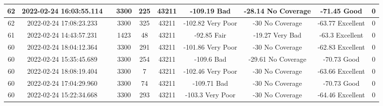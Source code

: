 \begin{longtable*}{|c|c|c|c|c|c|c|c|c|c|}
62&2022-02-24 16:03:55.114&&3300&225&43211& -109.19   Bad         & -28.14    No Coverage & -71.45    Good        & 0\\\hline
{}62&2022-02-24 17:08:23.233&&3300&325&43211& -102.82   Very Poor   & -30       No Coverage & -63.77    Excellent   & 0\\\hline
{}61&2022-02-24 14:43:57.231&&1423&48&43211& -92.85    Fair        & -19.27    Very Bad    & -63.3     Excellent   & 0\\\hline
{}60&2022-02-24 18:04:12.364&&3300&291&43211& -101.86   Very Poor   & -30       No Coverage & -62.83    Excellent   & 0\\\hline
{}60&2022-02-24 15:35:45.689&&3300&254&43211& -109.6    Bad         & -29.61    No Coverage & -70.73    Good        & 0\\\hline
{}60&2022-02-24 18:08:19.404&&3300&7&43211& -102.46   Very Poor   & -30       No Coverage & -63.66    Excellent   & 0\\\hline
{}60&2022-02-24 17:04:29.960&&3300&74&43211& -109.71   Bad         & -30       No Coverage & -70.73    Good        & 0\\\hline
{}60&2022-02-24 15:22:34.668&&3300&293&43211& -103.3    Very Poor   & -30       No Coverage & -64.46    Excellent   & 0\\\hline

\end{longtable*}
